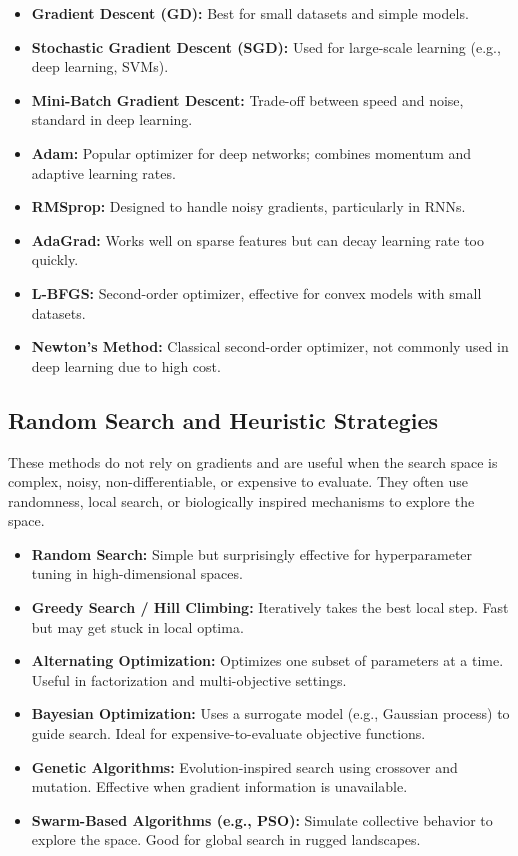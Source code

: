 \documentclass[12pt,openany, draft]{book}
\begin{document}
\begin{itemize}
    \item \textbf{Gradient Descent (GD):} Best for small datasets and simple models.
    \item \textbf{Stochastic Gradient Descent (SGD):} Used for large-scale learning (e.g., deep learning, SVMs).
    \item \textbf{Mini-Batch Gradient Descent:} Trade-off between speed and noise, standard in deep learning.
    \item \textbf{Adam:} Popular optimizer for deep networks; combines momentum and adaptive learning rates.
    \item \textbf{RMSprop:} Designed to handle noisy gradients, particularly in RNNs.
    \item \textbf{AdaGrad:} Works well on sparse features but can decay learning rate too quickly.
    \item \textbf{L-BFGS:} Second-order optimizer, effective for convex models with small datasets.
    \item \textbf{Newton’s Method:} Classical second-order optimizer, not commonly used in deep learning due to high cost.
\end{itemize}

\subsection{Random Search and Heuristic Strategies}

These methods do not rely on gradients and are useful when the search space is complex, noisy, non-differentiable, or expensive to evaluate. They often use randomness, local search, or biologically inspired mechanisms to explore the space.

\begin{itemize}
    \item \textbf{Random Search:} Simple but surprisingly effective for hyperparameter tuning in high-dimensional spaces.
    \item \textbf{Greedy Search / Hill Climbing:} Iteratively takes the best local step. Fast but may get stuck in local optima.
    \item \textbf{Alternating Optimization:} Optimizes one subset of parameters at a time. Useful in factorization and multi-objective settings.
    \item \textbf{Bayesian Optimization:} Uses a surrogate model (e.g., Gaussian process) to guide search. Ideal for expensive-to-evaluate objective functions.
    \item \textbf{Genetic Algorithms:} Evolution-inspired search using crossover and mutation. Effective when gradient information is unavailable.
    \item \textbf{Swarm-Based Algorithms (e.g., PSO):} Simulate collective behavior to explore the space. Good for global search in rugged landscapes.
\end{itemize}
\end{document}
